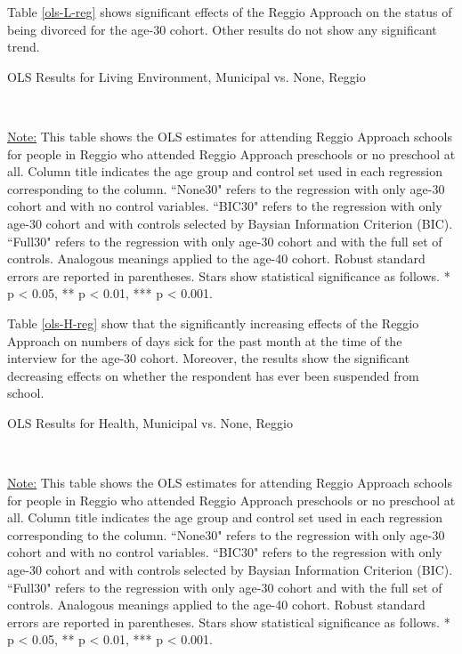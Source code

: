 Table \ref{ols-L-reg} shows significant effects of the Reggio Approach on the status of being divorced for the age-30 cohort. Other results do not show any significant trend. 

\begin{table}[H] \caption{OLS Results for Living Environment, Municipal vs. None, Reggio} \label{ols-L-reg}

\vspace{1ex} \\
\footnotesize\raggedright{\underline{Note:} This table shows the OLS estimates for attending Reggio Approach schools for people in Reggio who attended Reggio Approach preschools or no preschool at all. Column title indicates the age group and control set used in each regression corresponding to the column. ``None30" refers to the regression with only age-30 cohort and with no control variables. ``BIC30" refers to the regression with only age-30 cohort and with controls selected by Baysian Information Criterion (BIC). ``Full30" refers to the regression with only age-30 cohort and with the full set of controls. Analogous meanings applied to the age-40 cohort. Robust standard errors are reported in parentheses. Stars show statistical significance as follows. * p < 0.05, ** p < 0.01, *** p < 0.001.}
\end{table}


Table \ref{ols-H-reg} show that the significantly increasing effects of the Reggio Approach on numbers of days sick for the past month at the time of the interview for the age-30 cohort. Moreover, the results show the significant decreasing effects on whether the respondent has ever been suspended from school. 

\begin{table}[H] \caption{OLS Results for Health, Municipal vs. None, Reggio} \label{ols-H-reg}

\vspace{1ex} \\
\footnotesize\raggedright{\underline{Note:} This table shows the OLS estimates for attending Reggio Approach schools for people in Reggio who attended Reggio Approach preschools or no preschool at all. Column title indicates the age group and control set used in each regression corresponding to the column. ``None30" refers to the regression with only age-30 cohort and with no control variables. ``BIC30" refers to the regression with only age-30 cohort and with controls selected by Baysian Information Criterion (BIC). ``Full30" refers to the regression with only age-30 cohort and with the full set of controls. Analogous meanings applied to the age-40 cohort. Robust standard errors are reported in parentheses. Stars show statistical significance as follows. * p < 0.05, ** p < 0.01, *** p < 0.001.}
\end{table}

